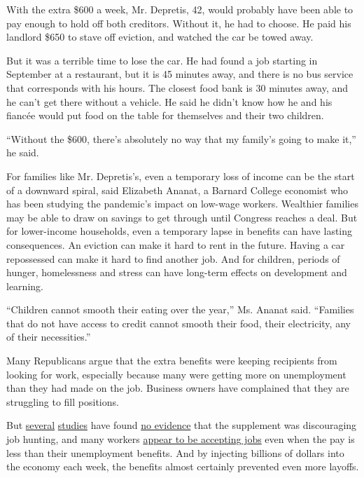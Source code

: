 With the extra \$600 a week, Mr. Depretis, 42, would probably have been
able to pay enough to hold off both creditors. Without it, he had to
choose. He paid his landlord \$650 to stave off eviction, and watched
the car be towed away.

But it was a terrible time to lose the car. He had found a job starting
in September at a restaurant, but it is 45 minutes away, and there is no
bus service that corresponds with his hours. The closest food bank is 30
minutes away, and he can't get there without a vehicle. He said he
didn't know how he and his fiancée would put food on the table for
themselves and their two children.

``Without the \$600, there's absolutely no way that my family's going to
make it,'' he said.

For families like Mr. Depretis's, even a temporary loss of income can be
the start of a downward spiral, said Elizabeth Ananat, a Barnard College
economist who has been studying the pandemic's impact on low-wage
workers. Wealthier families may be able to draw on savings to get
through until Congress reaches a deal. But for lower-income households,
even a temporary lapse in benefits can have lasting consequences. An
eviction can make it hard to rent in the future. Having a car
repossessed can make it hard to find another job. And for children,
periods of hunger, homelessness and stress can have long-term effects on
development and learning.

``Children cannot smooth their eating over the year,'' Ms. Ananat said.
``Families that do not have access to credit cannot smooth their food,
their electricity, any of their necessities.''

Many Republicans argue that the extra benefits were keeping recipients
from looking for work, especially because many were getting more on
unemployment than they had made on the job. Business owners have
complained that they are struggling to fill positions.

But
\href{https://papers.ssrn.com/sol3/papers.cfm?abstract_id=3664265}{several}
\href{https://www.dropbox.com/s/q0kcoix35jxt1u4/UI_Employment_HPS.pdf?dl=0}{studies}
have found
\href{https://news.yale.edu/2020/07/27/yale-study-finds-expanded-jobless-benefits-did-not-reduce-employment}{no
evidence} that the supplement was discouraging job hunting, and many
workers
\href{https://twitter.com/ernietedeschi/status/1283832188434362368}{appear
to be accepting jobs} even when the pay is less than their unemployment
benefits. And by injecting billions of dollars into the economy each
week, the benefits almost certainly prevented even more layoffs.

